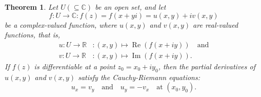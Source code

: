 \documentclass[12pt,openany]{book}
\newtheorem{theorem}{Theorem}[chapter]
\theoremstyle{definition}
\newcommand{\R}{\mathbb{R}}
\newcommand{\C}{\mathbb{C}}
\newcommand{\of}[1]{\left( #1 \right)}
\renewcommand{\Re}{\operatorname{Re}}
\renewcommand{\Im}{\operatorname{Im}}
\begin{document}
	
	\begin{tcolorbox}[colframe=thmcolor, title={\color{white}\bf Cauchy-Riemann Equations}]
		\begin{theorem}
			Let $U\of{\subseteq\C}$ be an open set, and let \[f:U\to\C:f(z) =f\of{x+yi} = u(x, y) + iv(x, y)
			\] be a complex-valued function, where $u(x, y)$ and $v(x, y)$ are real-valued functions, that is, \begin{align*}
			u:U\to\R&:(x,y)\mapsto \Re\of{f(x+iy)}\quad\text{and}\\ v:U\to\R&:\of{x,y}\mapsto\Im\of{f(x+iy)}.
			\end{align*} If $f(z)$ is differentiable at a point $z_0 = x_0 + iy_0$, then the partial derivatives of $u(x, y)$ and $v(x, y)$ satisfy the Cauchy-Riemann equations: 
			\[
			u_x=v_y\quad\text{and}\quad u_y=-v_x\quad\text{at $(x_0,y_0)$}.
			\]
		\end{theorem}
	\end{tcolorbox}
	
\end{document}
